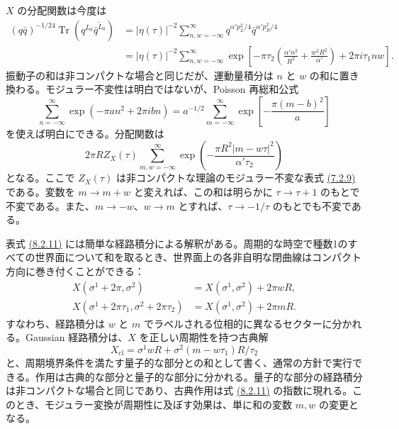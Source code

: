 
$X$ の分配関数は今度は
\begin{equation}
\begin{aligned}
(q\bar q)^{-1/24}\operatorname{Tr}(q^{L_0}\bar q^{\widetilde L_0})
&=|\eta(\tau)|^{-2}\sum_{n,w=-\infty}^{\infty}
q^{\alpha'p_L^2/4}\bar q^{\alpha'p_R^2/4}\\
&=|\eta(\tau)|^{-2}\sum_{n,w=-\infty}^{\infty}
\exp\left[-\pi\tau_2\left(\frac{\alpha'n^2}{R^2}+\frac{w^2R^2}{\alpha'}\right)+2\pi i\tau_1nw\right].
\end{aligned}
\tag{8.2.9}\label{eq:8.2.9}
\end{equation}
振動子の和は非コンパクトな場合と同じだが、運動量積分は $n$ と $w$ の和に置き換わる。モジュラー不変性は明白ではないが、Poisson 再総和公式
\begin{equation}
\sum_{n=-\infty}^{\infty}\exp(-\pi an^2+2\pi ibn)
=a^{-1/2}\sum_{m=-\infty}^{\infty}\exp\left[-\frac{\pi(m-b)^2}{a}\right]
\tag{8.2.10}\label{eq:8.2.10}
\end{equation}
を使えば明白にできる。分配関数は
\begin{equation}
2\pi RZ_X(\tau)\sum_{m,w=-\infty}^{\infty}
\exp\left(-\frac{\pi R^2|m-w\tau|^2}{\alpha'\tau_2}\right)
\tag{8.2.11}\label{eq:8.2.11}
\end{equation}
となる。ここで $Z_X(\tau)$ は非コンパクトな理論のモジュラー不変な表式 \hyperref[eq:7.2.9]{(7.2.9)} である。変数を $m\to m+w$ と変えれば、この和は明らかに $\tau\to\tau+1$ のもとで不変である。また、$m\to-w$、$w\to m$ とすれば、$\tau\to-1/\tau$ のもとでも不変である。

表式 \hyperref[eq:8.2.11]{(8.2.11)} には簡単な経路積分による解釈がある。周期的な時空で種数1のすべての世界面について和を取るとき、世界面上の各非自明な閉曲線はコンパクト方向に巻き付くことができる：
\begin{align}
X(\sigma^1+2\pi,\sigma^2)&=X(\sigma^1,\sigma^2)+2\pi wR,
\tag{8.2.12a}\label{eq:8.2.12a}\\
X(\sigma^1+2\pi\tau_1,\sigma^2+2\pi\tau_2)&=X(\sigma^1,\sigma^2)+2\pi mR.
\tag{8.2.12b}\label{eq:8.2.12b}
\end{align}
すなわち、経路積分は $w$ と $m$ でラベルされる位相的に異なるセクターに分かれる。Gaussian 経路積分は、$X$ を正しい周期性を持つ古典解
\begin{equation}
X_{\mathrm{cl}}=\sigma^1wR+\sigma^2(m-w\tau_1)R/\tau_2
\tag{8.2.13}\label{eq:8.2.13}
\end{equation}
と、周期境界条件を満たす量子的な部分との和として書く、通常の方針で実行できる。作用は古典的な部分と量子的な部分に分かれる。量子的な部分の経路積分は非コンパクトな場合と同じであり、古典作用は式 \hyperref[eq:8.2.11]{(8.2.11)} の指数に現れる。このとき、モジュラー変換が周期性に及ぼす効果は、単に和の変数 $m,w$ の変更となる。

